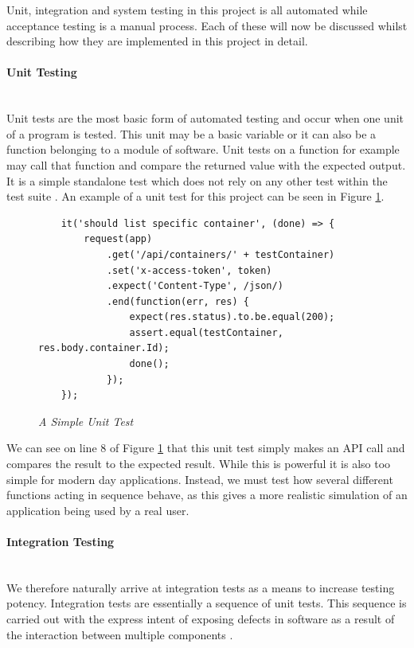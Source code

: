Unit, integration and system testing in this project is all automated while acceptance testing is a manual process. Each of these will now be discussed whilst describing how they are implemented in this project in detail.

\paragraph{Unit Testing}\mbox{}\\
Unit tests are the most basic form of automated testing and occur when one unit of a program is tested. This unit may be a basic variable or it can also be a function belonging to a module of software. Unit tests on a function for example may call that function and compare the returned value with the expected output. It is a simple standalone test which does not rely on any other test within the test suite \citep{UnitTesting2017}. An example of a unit test for this project can be seen in Figure \ref{fig:unit_test}.

\begin{figure}[!ht]
\begin{lstlisting}
	it('should list specific container', (done) => {
		request(app)
			.get('/api/containers/' + testContainer)
			.set('x-access-token', token)
			.expect('Content-Type', /json/)
			.end(function(err, res) {
				expect(res.status).to.be.equal(200);
				assert.equal(testContainer, res.body.container.Id);
				done();
			});
	}); 
\end{lstlisting}
\caption{\em A Simple Unit Test}
\label{fig:unit_test}
\end{figure}

We can see on line 8 of Figure \ref{fig:unit_test} that this unit test simply makes an \gls{API} call and compares the result to the expected result. While this is powerful it is also too simple for modern day applications. Instead, we must test how several different functions acting in sequence behave, as this gives a more realistic simulation of an application being used by a real user.

\paragraph{Integration Testing}\mbox{}\\
We therefore naturally arrive at integration tests as a means to increase testing potency. Integration tests are essentially a sequence of unit tests. This sequence is carried out with the express intent of exposing defects in software as a result of the interaction between multiple components \citep{IntegrationTesting2017}.

